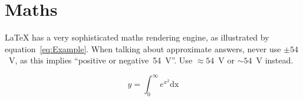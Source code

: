 \section{Maths}

\LaTeX{} has a very sophisticated maths rendering engine, as illustrated by equation~\ref{eq:Example}.  When talking about approximate answers, never use $\pm{54}$~V, as this implies ``positive or negative~54~V''.  Use $\approx{54}$~V or $\sim{54}$~V instead.

\begin{equation}
  y = \int_0^\infty e^{x^2} \mathrm{dx}
  \label{eq:Example}
\end{equation}


